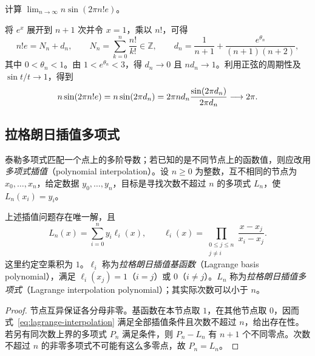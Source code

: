 \documentclass[UTF8,12pt,a4paper,fontset=fandol]{ctexbook}
\begin{document}
\begin{example}
\label{ex:taylor-factorial-exponential-limit}
计算 $\lim_{n\to\infty}n\sin(2\pi n!e)$。
\end{example}

\begin{solve}
将 $e^x$ 展开到 $n+1$ 次并令 $x=1$，乘以 $n!$，可得
\[
    n!e=N_n+d_n,\qquad
    N_n=\sum_{k=0}^n\frac{n!}{k!}\in\mathbb{Z},\qquad
    d_n=\frac1{n+1}+\frac{e^{\theta_n}}{(n+1)(n+2)},
\]
其中 $0<\theta_n<1$。由 $1<e^{\theta_n}<3$，得 $d_n\to0$ 且 $nd_n\to1$。利用正弦的周期性及 $\sin t/t\to1$，得到
\[
    n\sin(2\pi n!e)=n\sin(2\pi d_n)
    =2\pi nd_n\frac{\sin(2\pi d_n)}{2\pi d_n}\longrightarrow2\pi.
    \qedhere
\]
\end{solve}

\subsection{拉格朗日插值多项式}
\label{subsec:lagrange-interpolation-polynomial}

泰勒多项式匹配一个点上的多阶导数；若已知的是不同节点上的函数值，则应改用\emph{多项式插值}（polynomial interpolation）。设 $n\geq0$ 为整数，互不相同的节点为 $x_0,\ldots,x_n$，给定数据 $y_0,\ldots,y_n$，目标是寻找次数不超过 $n$ 的多项式 $L_n$，使 $L_n(x_i)=y_i$。

\begin{theorem}[拉格朗日插值公式]
\label{thm:lagrange-interpolation}
上述插值问题存在唯一解，且
\begin{equation}
    L_n(x)=\sum_{i=0}^n y_i\ell_i(x),\qquad
    \ell_i(x)=\prod_{\substack{0\leq j\leq n\\j\neq i}}
                  \frac{x-x_j}{x_i-x_j}.
    \label{eq:lagrange-interpolation}
\end{equation}
这里约定空乘积为 $1$。$\ell_i$ 称为\emph{拉格朗日插值基函数}（Lagrange basis polynomial），满足 $\ell_i(x_j)=1$（$i=j$）或 $0$（$i\neq j$）。$L_n$ 称为\emph{拉格朗日插值多项式}（Lagrange interpolation polynomial）；其实际次数可以小于 $n$。
\end{theorem}

\begin{proof}
节点互异保证各分母非零。基函数在本节点取 $1$，在其他节点取 $0$，因而式~\eqref{eq:lagrange-interpolation} 满足全部插值条件且次数不超过 $n$，给出存在性。若另有同次数上界的多项式 $P_n$ 满足条件，则 $P_n-L_n$ 有 $n+1$ 个不同零点。次数不超过 $n$ 的非零多项式不可能有这么多零点，故 $P_n=L_n$。
\end{proof}
\end{document}
